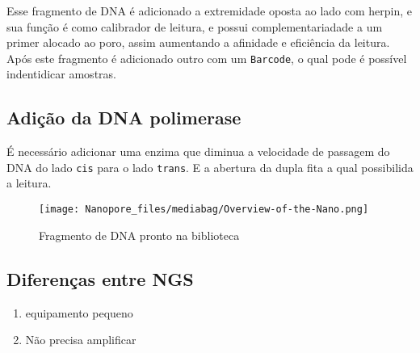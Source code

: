 \documentclass[
  letterpaper,
  DIV=11,
  numbers=noendperiod]{scrartcl}
\providecommand{\tightlist}{%
  \setlength{\itemsep}{0pt}\setlength{\parskip}{0pt}}\usepackage{longtable,booktabs,array}
\begin{document}
Esse fragmento de DNA é adicionado a extremidade oposta ao lado com
herpin, e sua função é como calibrador de leitura, e possui
complementariadade a um primer alocado ao poro, assim aumentando a
afinidade e eficiência da leitura. Após este fragmento é adicionado
outro com um \texttt{Barcode}, o qual pode é possível indentidicar
amostras.

\subsection{Adição da DNA
polimerase}\label{adiuxe7uxe3o-da-dna-polimerase}

É necessário adicionar uma enzima que diminua a velocidade de passagem
do DNA do lado \texttt{cis} para o lado \texttt{trans}. E a abertura da
dupla fita a qual possibilida a leitura.

\begin{figure}[H]

{\centering \texttt{[image: Nanopore\_files/mediabag/Overview-of-the-Nano.png]}

}

\caption{Fragmento de DNA pronto na biblioteca}

\end{figure}%

\subsection{Diferenças entre NGS}\label{diferenuxe7as-entre-ngs}

\begin{enumerate}
\def\labelenumi{\arabic{enumi}.}
\tightlist
\item
  equipamento pequeno
\item
  Não precisa amplificar
\end{enumerate}
\end{document}
